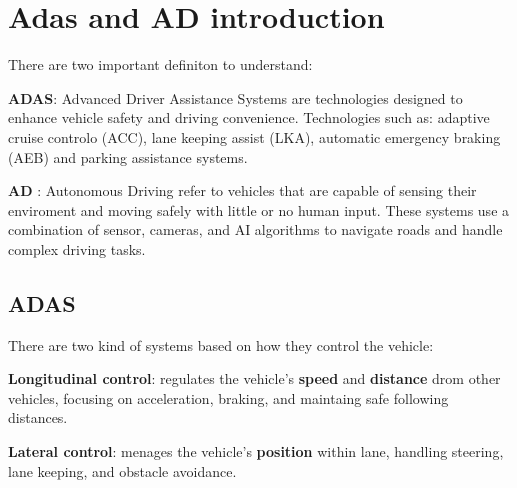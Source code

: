 \section{Adas and AD introduction}

There are two important definiton to understand:
\begin{compactitemize}
    \item \textbf{ADAS}: Advanced Driver Assistance Systems are technologies designed to enhance vehicle safety and driving convenience.
                         Technologies such as: adaptive cruise controlo (ACC), lane keeping assist (LKA), automatic emergency braking (AEB) and parking assistance systems.
    \item \textbf{AD} : Autonomous Driving refer to vehicles that are capable of sensing their enviroment and moving safely with little or no human input.
                        These systems use a combination of sensor, cameras, and AI algorithms to navigate roads and handle complex driving tasks.
\end{compactitemize}

\subsection{ADAS}

There are two kind of systems based on how they control the vehicle:
\begin{compactitemize}
    \item \textbf{Longitudinal control}: regulates the vehicle's \textbf{speed} and \textbf{distance} drom other vehicles, focusing on acceleration, braking, and maintaing safe following  distances.
    \item \textbf{Lateral control}: menages the vehicle's \textbf{position} within lane, handling steering, lane keeping, and obstacle avoidance.
\end{compactitemize}

